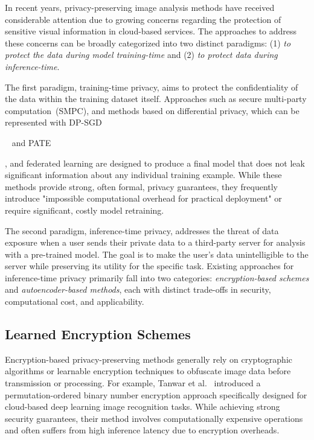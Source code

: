 \documentclass{ieeeaccess}
\begin{document}
{In recent years, privacy-preserving image analysis methods have received considerable attention due to growing concerns regarding the protection of sensitive visual information in cloud-based services. The approaches to address these concerns can be broadly categorized into two distinct paradigms: (1) \textit{to protect the data during model training-time} and (2) \textit{to protect data during inference-time}.

The first paradigm, training-time privacy, aims to protect the confidentiality of the data within the training dataset itself. Approaches such as secure multi-party computation~(SMPC), and methods based on differential privacy, which can be represented with DP-SGD}~\cite{Abadi_2016}{ and PATE}~\cite{46614}{, and federated learning are designed to produce a final model that does not leak significant information about any individual training example. While these methods provide strong, often formal, privacy guarantees, they frequently introduce "impossible computational overhead for practical deployment" or require significant, costly model retraining.

The second paradigm, inference-time privacy, addresses the threat of data exposure when a user sends their private data to a third-party server for analysis with a pre-trained model. The goal is to make the user's data unintelligible to the server while preserving its utility for the specific task. Existing approaches for inference-time privacy primarily fall into two categories: \textit{encryption-based schemes} and \textit{autoencoder-based methods}, each with distinct trade-offs in security, computational cost, and applicability.}

\subsection{Learned Encryption Schemes}

Encryption-based privacy-preserving methods generally rely on cryptographic algorithms or learnable encryption techniques to obfuscate image data before transmission or processing. For example, Tanwar et al.~\cite{TANWAR2022103503} introduced a permutation-ordered binary number encryption approach specifically designed for cloud-based deep learning image recognition tasks. While achieving strong security guarantees, their method involves computationally expensive operations and often suffers from high inference latency due to encryption overheads.
\end{document}
